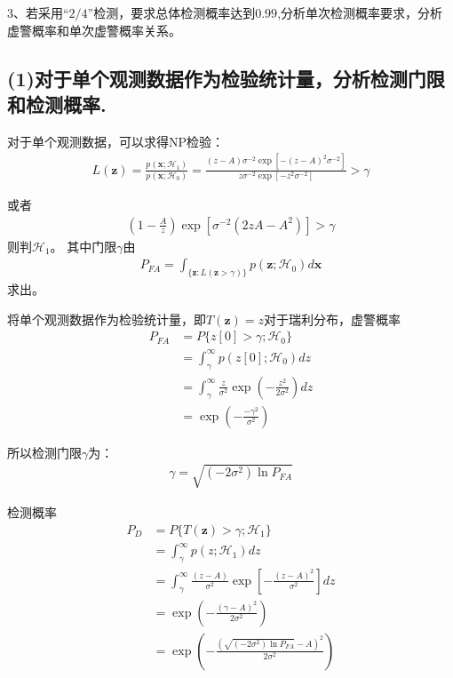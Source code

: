 \documentclass[fontset=windows]{article}
\numberwithin{figure}{section}
\begin{document}
3、若采用“\(2/4\)”检测，要求总体检测概率达到\(0.99\),分析单次检测概率要求，分析虚警概率和单次虚警概率关系。

\subsection*{(1)对于单个观测数据作为检验统计量，分析检测门限和检测概率.}

对于单个观测数据，可以求得NP检验：
\begin{align*}
    L(\mathbf{\mathbf{z}})=\frac{p(\mathbf{x};\mathcal{H}_1)}{p(\mathbf{x};\mathcal{H}_0)}
    =\frac{(z-A)\sigma^{-2}\exp\left[-(z-A)^2\sigma^{-2}\right]}
    {z\sigma^{-2}\exp\left[-z^2\sigma^{-2}\right]}>\gamma
\end{align*}

或者
\begin{align*}
    (1-\frac{A}{z})\exp[\sigma^{-2}(2zA-A^2)]>\gamma
\end{align*}
则判\(\mathcal{H}_1\)。
其中门限\(\gamma\)由
\begin{align*}
    P_{FA}=\int_{\{\mathbf{z}:L(\mathbf{z}>\gamma)\}}p(\mathbf{z};\mathcal{H}_0)d\mathbf{x}
\end{align*}
求出。

将单个观测数据作为检验统计量，即\(T(\mathbf{z})=z\)对于瑞利分布，虚警概率
\begin{align*}
    P_{FA} & =P\{z[0]>\gamma;\mathcal{H}_0\}                                                     \\
           & =\int_{\gamma}^{\infty}p(z[0];\mathcal{H}_0)dz                                      \\
           & =\int_{\gamma}^{\infty}\frac{z}{\sigma^2}\exp \left(-\frac{z^2}{2\sigma^2}\right)dz \\
           & =\exp\left(-\frac{-\gamma^2}{\sigma^2}\right)
\end{align*}

所以检测门限\(\gamma\)为：
\begin{align*}
    \gamma=\sqrt{(-2\sigma^2)\ln P_{FA}}
\end{align*}

检测概率
\begin{align*}
    P_D & =P\{T(\mathbf{z})>\gamma;\mathcal{H}_1\}                                                  \\
        & =\int_{\gamma}^{\infty}p(z;\mathcal{H}_1)dz                                               \\
        & =\int_{\gamma}^{\infty}\frac{(z-A)}{\sigma^2}\exp\left[-\frac{(z-A)^2}{\sigma^2}\right]dz \\
        & =\exp\left(-\frac{(\gamma-A)^2}{2\sigma^2}\right)                                         \\
        & =\exp\left(-\frac{(\sqrt{(-2\sigma^2)\ln P_{FA}}-A)^2}{2\sigma^2}\right)
\end{align*}
\end{document}
